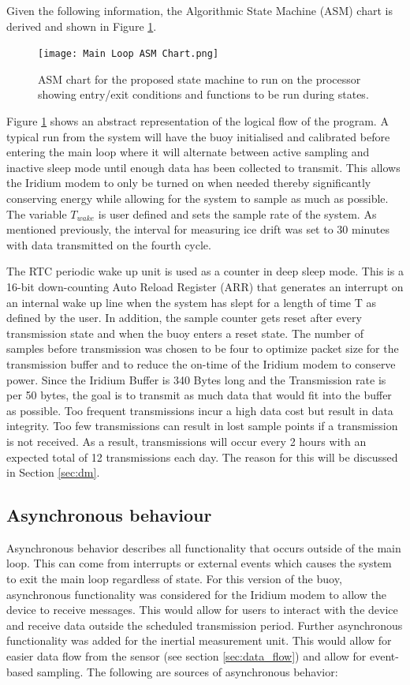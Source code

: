 Given the following information, the Algorithmic State Machine (ASM) chart is derived and shown in Figure \ref{fig:ASM_chart}.

\begin{figure}[H]
	\centering
	\texttt{[image: Main Loop ASM Chart.png]}
	\caption{ASM chart for the proposed state machine to run on the processor showing entry/exit conditions and functions to be run during states.}
	\label{fig:ASM_chart}
\end{figure}

Figure \ref{fig:ASM_chart} shows an abstract representation of the logical flow of the program. A typical run from the system will have the buoy initialised and calibrated before entering the main loop where it will alternate between active sampling and inactive sleep mode until enough data has been collected to transmit. This allows the Iridium modem to only be turned on when needed thereby significantly conserving energy while allowing for the system to sample as much as possible. The variable $T_{wake}$ is user defined and sets the sample rate of the system. As mentioned previously, the interval for measuring ice drift was set to 30 minutes with data transmitted on the fourth cycle.

The RTC periodic wake up unit is used as a counter in deep sleep mode. This is a 16-bit down-counting Auto Reload Register (ARR) that generates an interrupt on an internal wake up line when the system has slept for a length of time T as defined by the user. In addition, the sample counter gets reset after every transmission state and when the buoy enters a reset state. The number of samples before transmission was chosen to be four to optimize packet size for the transmission buffer and to reduce the on-time of the Iridium modem to conserve power. Since the Iridium Buffer is 340 Bytes long and the Transmission rate is per 50 bytes, the goal is to transmit as much data that would fit into the buffer as possible. Too frequent transmissions incur a high data cost but result in data integrity. Too few transmissions can result in lost sample points if a transmission is not received. As a result, transmissions will occur every 2 hours with an expected total of 12 transmissions each day. The reason for this will be discussed in Section \ref{sec:dm}.

\subsection{Asynchronous behaviour}
\label{subsec:ch5_asynch}
Asynchronous behavior describes all functionality that occurs outside of the main loop. This can come from interrupts or external events which causes the system to exit the main loop regardless of state. For this version of the buoy, asynchronous functionality was considered for the Iridium modem to allow the device to receive messages. This would allow for users to interact with the device and receive data outside the scheduled transmission period. Further asynchronous functionality was added for the inertial measurement unit. This would allow for easier data flow from the sensor (see section \ref{sec:data_flow}) and allow for event-based sampling. The following are sources of  asynchronous behavior:

